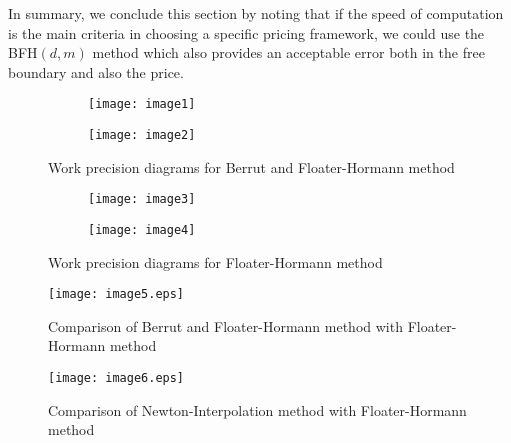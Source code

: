 \documentclass[fleqn,final,3p,11pt]{elsarticle}
\theoremstyle{definition}
\theoremstyle{remark}
\numberwithin{equation}{section}
\begin{document}
In summary, we conclude this section by noting that if the speed of computation is the main criteria in choosing a specific pricing framework, we could use the BFH$(d,m)$ method which also provides an acceptable error both in the free boundary and also the price. 
\begin{figure}
\centering
\begin{subfigure}{.5\textwidth}
  \centering
  \texttt{[image: image1]}
  \label{fig:sub51}
\end{subfigure}%
\begin{subfigure}{.5\textwidth}
  \centering
  \texttt{[image: image2]}
  \label{fig:sub52}
\end{subfigure}
\caption{Work precision diagrams for Berrut and Floater-Hormann method }
\label{fig:test 1}
\end{figure}
 \begin{figure}
\centering
\begin{subfigure}{.5\textwidth}
  \centering
  \texttt{[image: image3]}
  \caption{}
  \label{fig:sub31}
\end{subfigure}%
\begin{subfigure}{.5\textwidth}
  \centering
  \texttt{[image: image4]}
  \caption{}
  \label{fig:sub32}
\end{subfigure}
\caption{Work precision diagrams for Floater-Hormann method }
\label{fig:test 2}
\end{figure}
\begin{figure}[h]
	\begin{center}
		\texttt{[image: image5.eps]}
		\caption{Comparison of Berrut and Floater-Hormann method with Floater-Hormann method}
		\label{test222}
	\end{center}
\end{figure}
\begin{figure}[h]	
	\begin{center}
		\texttt{[image: image6.eps]}
		\caption{Comparison of Newton-Interpolation method with Floater-Hormann method }
		\label{modifiedcom}
	\end{center}                                            
\end{figure}
\end{document}
